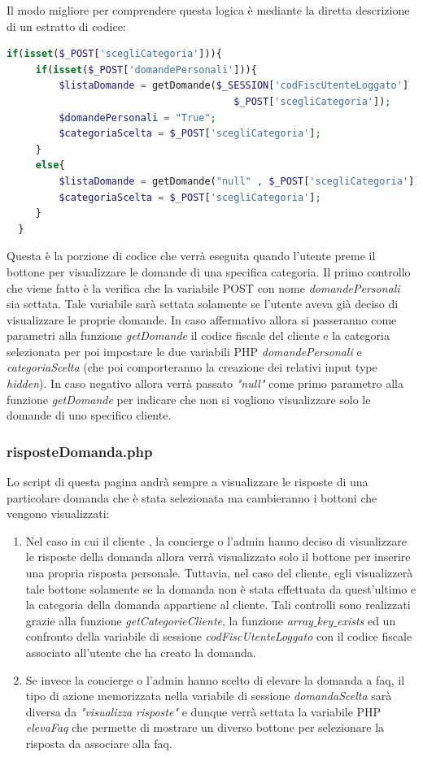 \documentclass [a4paper, 12pt]{book}
\begin{document}
Il modo migliore per comprendere questa logica è mediante la diretta descrizione di un estratto di codice:
\begin{lstlisting}[style=XML , language=PHP]
 if(isset($_POST['scegliCategoria'])){      
     if(isset($_POST['domandePersonali'])){
         $listaDomande = getDomande($_SESSION['codFiscUtenteLoggato']      
                                       $_POST['scegliCategoria']);
         $domandePersonali = "True";
         $categoriaScelta = $_POST['scegliCategoria'];
     }          
     else{
         $listaDomande = getDomande("null" , $_POST['scegliCategoria']);
         $categoriaScelta = $_POST['scegliCategoria'];
     }                
  }
\end{lstlisting}
Questa è la porzione di codice che verrà eseguita quando l'utente preme il bottone per visualizzare le domande di una specifica categoria. Il primo controllo che viene fatto è la verifica che la variabile POST con nome \textit{domandePersonali} sia settata. Tale variabile sarà settata solamente se l'utente aveva già deciso di visualizzare le proprie domande. In caso affermativo allora si passeranno come parametri alla funzione \textit{getDomande} il codice fiscale del cliente e la categoria selezionata per poi impostare le due variabili PHP \textit{domandePersonali} e \textit{categoriaScelta} (che poi comporteranno la creazione dei relativi input type \textit{hidden}). In caso negativo allora verrà passato \textit{"null"} come primo parametro alla funzione \textit{getDomande} per indicare che non si vogliono visualizzare solo le domande di uno specifico cliente.

\subsubsection{risposteDomanda.php}
Lo script di questa pagina andrà sempre a visualizzare le risposte di una particolare domanda che è stata selezionata ma cambieranno i bottoni che vengono visualizzati:
\begin{enumerate}
\item Nel caso in cui il cliente , la concierge o l'admin hanno deciso di visualizzare le risposte della domanda allora verrà visualizzato solo il bottone per inserire una propria risposta personale. Tuttavia, nel caso del cliente, egli visualizzerà tale bottone solamente se la domanda non è stata effettuata da quest'ultimo e la categoria della domanda appartiene al cliente. Tali controlli sono realizzati grazie alla funzione \textit{getCategorieCliente}, la funzione \textit{array$\_$key$\_$exists} ed un confronto della variabile di sessione \textit{codFiscUtenteLoggato} con il codice fiscale associato all'utente che ha creato la domanda.
\item Se invece la concierge o l'admin hanno scelto di elevare la domanda a faq, il tipo di azione memorizzata nella variabile di sessione \textit{domandaScelta} sarà diversa da \textit{"visualizza risposte"} e dunque verrà settata la variabile PHP \textit{elevaFaq} che permette di mostrare un diverso bottone per selezionare la risposta da associare alla faq.
\end{enumerate}
\end{document}
